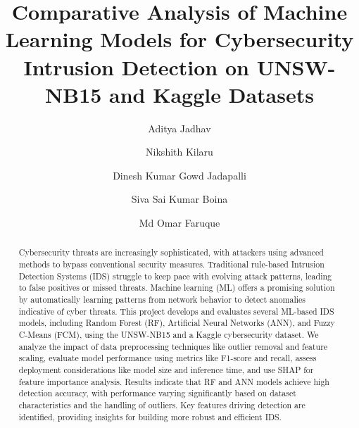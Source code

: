 \documentclass[sigconf,screen,final,nonacm]{acmart}
\begin{document}
\title{Comparative Analysis of Machine Learning Models for Cybersecurity Intrusion Detection on UNSW-NB15 and Kaggle Datasets}




\author{Aditya Jadhav}

\author{Nikshith Kilaru}

\author{Dinesh Kumar Gowd Jadapalli}

\author{Siva Sai Kumar Boina}

\author{Md Omar Faruque}


\begin{abstract}
Cybersecurity threats are increasingly sophisticated, with attackers using advanced methods to bypass conventional security measures. Traditional rule-based Intrusion Detection Systems (IDS) struggle to keep pace with evolving attack patterns, leading to false positives or missed threats. Machine learning (ML) offers a promising solution by automatically learning patterns from network behavior to detect anomalies indicative of cyber threats. This project develops and evaluates several ML-based IDS models, including Random Forest (RF), Artificial Neural Networks (ANN), and Fuzzy C-Means (FCM), using the UNSW-NB15 and a Kaggle cybersecurity dataset. We analyze the impact of data preprocessing techniques like outlier removal and feature scaling, evaluate model performance using metrics like F1-score and recall, assess deployment considerations like model size and inference time, and use SHAP for feature importance analysis. Results indicate that RF and ANN models achieve high detection accuracy, with performance varying significantly based on dataset characteristics and the handling of outliers. Key features driving detection are identified, providing insights for building more robust and efficient IDS.
\end{abstract}
\end{document}
